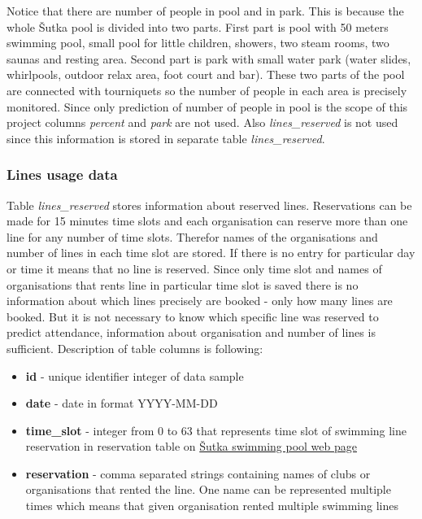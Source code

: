 \documentclass{article}
\begin{document}
Notice that there are number of people in pool and in park. This is because the whole \v{S}utka pool is divided into two parts. First part is pool with 50 meters swimming pool, small pool for little children, showers, two steam rooms, two saunas and resting area. Second part is park with small water park (water slides, whirlpools, outdoor relax area, foot court and bar). These two parts of the pool are connected with tourniquets so the number of people in each area is precisely monitored. Since only prediction of number of people in pool is the scope of this project columns \emph{percent} and \emph{park} are not used. Also \emph{lines\_reserved} is not used since this information is stored in separate table \emph{lines\_reserved}.

\subsubsection{Lines usage data} \label{sec:lines_usage}
Table \emph{lines\_reserved} stores information about reserved lines. Reservations can be made for 15 minutes time slots and each organisation can reserve more than one line for any number of time slots. Therefor names of the organisations and number of lines in each time slot are stored. If there is no entry for particular day or time it means that no line is reserved. Since only time slot and names of organisations that rents line in particular time slot is saved there is no information about which lines precisely are booked - only how many lines are booked. But it is not necessary to know which specific line was reserved to predict attendance, information about organisation and number of lines is sufficient. Description of table columns is following:
\begin{itemize}
    \item \textbf{id} - unique identifier integer of data sample
    \item \textbf{date} - date in format YYYY-MM-DD
    \item \textbf{time\_slot} - integer from 0 to 63 that represents time slot of swimming line reservation in reservation table on \href{https://www.sutka.eu/en/obsazenost-bazenu}{\v{S}utka swimming pool web page}
    \item \textbf{reservation} - comma separated strings containing names of clubs or organisations that rented the line. One name can be represented multiple times which means that given organisation rented multiple swimming lines
\end{itemize}
\end{document}
